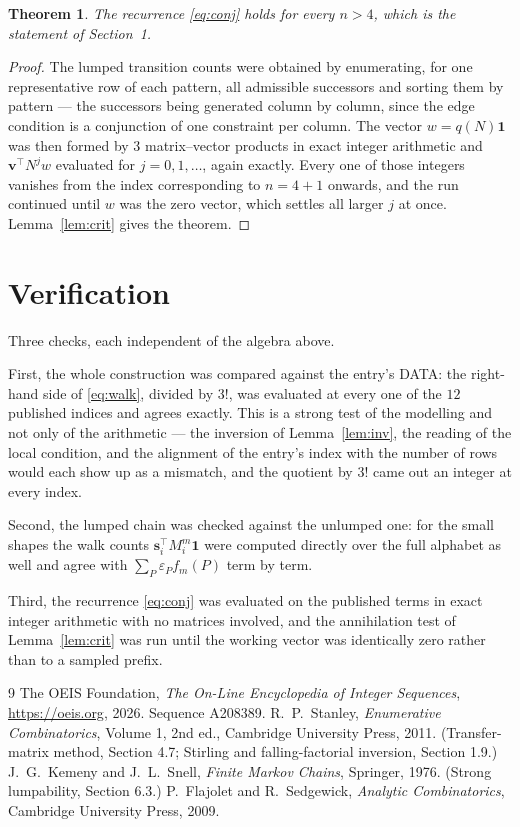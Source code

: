 \documentclass[11pt,a4paper]{article}
\theoremstyle{plain}
\newtheorem{theorem}{Theorem}
\theoremstyle{definition}
\begin{document}
\begin{theorem}
The recurrence \eqref{eq:conj} holds for every $n>4$, which is the statement of
Section~1.
\end{theorem}

\begin{proof}
The lumped transition counts were obtained by enumerating, for one representative row of
each pattern, all admissible successors and sorting them by pattern --- the successors being
generated column by column, since the edge condition is a conjunction of one constraint per
column. The vector $w=q(N)\mathbf{1}$ was then formed by $3$ matrix--vector products
in exact integer arithmetic and $\mathbf{v}^{\!\top}N^{j}w$ evaluated for
$j=0,1,\dots$, again exactly. Every one of those integers vanishes from the index
corresponding to $n=4+1$ onwards, and the run continued until $w$ was the zero vector,
which settles all larger $j$ at once. Lemma~\ref{lem:crit} gives the theorem.
\end{proof}

\section{Verification}

Three checks, each independent of the algebra above.

First, the whole construction was compared against the entry's DATA: the right-hand side of
\eqref{eq:walk}, divided by $3!$, was evaluated at every one of the $12$
published indices and agrees exactly. This is a strong test of the modelling and not only of
the arithmetic --- the inversion of Lemma~\ref{lem:inv}, the reading of the local
condition, and the alignment of the entry's index with the number of rows would each
show up as a mismatch, and the quotient by $3!$ came out an integer at every index.

Second, the lumped chain was checked against the unlumped one: for the small shapes the walk
counts $\mathbf{s}_i^{\!\top}M_i^{m}\mathbf{1}$ were computed directly over the full
alphabet as well and agree with $\sum_P\varepsilon_Pf_m(P)$ term by term.

Third, the recurrence \eqref{eq:conj} was evaluated on the published terms in exact integer
arithmetic with no matrices involved, and the annihilation test of Lemma~\ref{lem:crit} was
run until the working vector was identically zero rather than to a sampled prefix.

\begin{thebibliography}{9}
 The OEIS Foundation, \emph{The On-Line Encyclopedia of Integer
Sequences}, \url{https://oeis.org}, 2026. Sequence A208389.
 R.~P.~Stanley, \emph{Enumerative Combinatorics}, Volume 1, 2nd ed.,
Cambridge University Press, 2011. (Transfer-matrix method, Section 4.7; Stirling and
falling-factorial inversion, Section 1.9.)
 J.~G.~Kemeny and J.~L.~Snell, \emph{Finite Markov Chains}, Springer,
1976. (Strong lumpability, Section 6.3.)
 P.~Flajolet and R.~Sedgewick, \emph{Analytic Combinatorics}, Cambridge
University Press, 2009.
\end{thebibliography}
\end{document}
